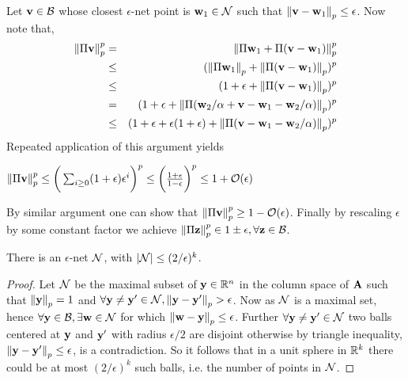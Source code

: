 Let $\*v \in \mcal B$ whose closest $\epsilon$-net point is $\*w_{1} \in \mcal N$ such that $\norm{\*v - \*w_{1}}_{p} \leq \epsilon$. Now note that,
\begin{eqnarray*}
 \norm{\Pi \*v}_{p}^{p} &=& \norm{\Pi \*w_{1} + \Pi(\*v-\*w_{1})}_{p}^{p} \nonumber \\
 &\leq& (\norm{\Pi \*w_{1}}_{p} + \norm{\Pi(\*v-\*w_{1})}_{p})^{p} \nonumber \\
 &\leq& (1+\epsilon + \norm{\Pi(\*v-\*w_{1})}_{p})^{p} \nonumber \\
 &=& (1+\epsilon + \norm{\Pi(\*w_{2}/\alpha + \*v-\*w_{1}-\*w_{2}/\alpha)}_{p})^{p} \nonumber \\
 &\leq& (1+\epsilon + \epsilon(1+\epsilon) + \norm{\Pi(\*v-\*w_{1}-\*w_{2}/\alpha)}_{p})^{p}
\end{eqnarray*}
% 
Repeated application of this argument yields
% 
\begin{center}
 $\norm{\Pi \*v}_{p}^{p} \leq \bigg(\sum_{i\geq0} (1+\epsilon)\epsilon^{i}\bigg)^{p} \leq \bigg(\frac{1+\epsilon}{1-\epsilon}\bigg)^{p} \leq 1 + \mcal O(\epsilon)$ 
\end{center}
% 
By similar argument one can show that $\norm{\Pi \*v}_{p}^{p} \geq 1 - \mcal O(\epsilon)$. Finally by rescaling $\epsilon$ by some constant factor we achieve $\norm{\Pi \*z}_{p}^{p} \in 1\pm\epsilon, \forall \*z \in \mcal B$.
\begin{lemma}{\label{lemma:netSize}}
 There is an $\epsilon$-net $\mcal N$, with $\vert\mcal N\vert \leq (2/\epsilon)^{k}$.
\end{lemma}
\begin{proof}
Let $\mcal N$ be the maximal subset of $\*y \in \~R^{n}$ in the column space of $\*A$ such that $\norm{\*y}_{p} = 1$ and $\forall \*y \neq \*y' \in \mcal N, \norm{\*y-\*y'}_{p} > \epsilon$. Now as $\mcal N$ is a maximal set, hence $\forall \*y \in \mcal B, \exists \*w \in \mcal N$ for which $\norm{\*w-\*y}_{p} \leq \epsilon$. Further $\forall \*y \neq \*y' \in \mcal N$ two balls centered at $\*y$ and $\*y'$ with radius $\epsilon/2$ are disjoint otherwise by triangle inequality, $\norm{\*y-\*y'}_{p} \leq \epsilon$, is a contradiction. So it follows that in a unit sphere in $\~R^{k}$ there could be at most $(2/\epsilon)^{k}$ such balls, i.e. the number of points in $\mcal N$. 
\end{proof}
% 
